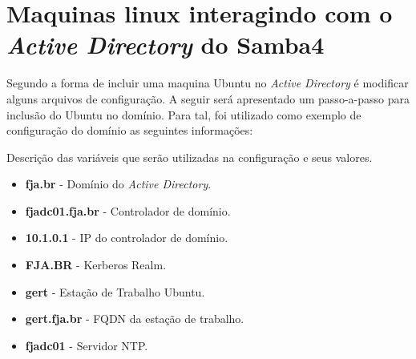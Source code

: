 \section{Maquinas linux interagindo com o \textit{Active Directory} do  Samba4}

Segundo \cite{UBUNTU-WIKI} a forma de incluir uma maquina Ubuntu no \textit{Active Directory} é modificar alguns arquivos de configuração. A seguir será apresentado um passo-a-passo para inclusão do Ubuntu no domínio. Para tal, foi utilizado como exemplo de configuração do domínio as seguintes informações:

Descrição das variáveis que serão utilizadas na configuração e seus valores.

\begin{itemize}
	\item \textbf{fja.br} -  Domínio do \textit{Active Directory}.
	\item \textbf{fjadc01.fja.br} - Controlador de domínio.
	\item \textbf{10.1.0.1} - IP do controlador de domínio.
	\item \textbf{FJA.BR} - Kerberos Realm.
	\item \textbf{gert} - Estação de Trabalho Ubuntu.
	\item \textbf{gert.fja.br} - FQDN da estação de trabalho.
	\item \textbf{fjadc01} - Servidor NTP.
\end{itemize}

